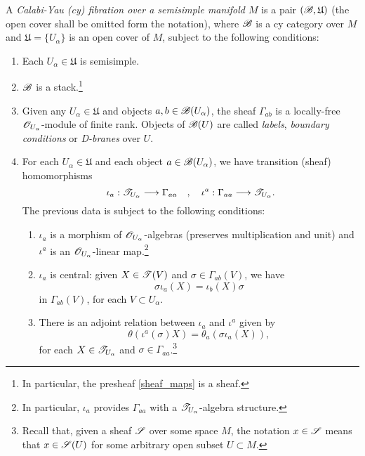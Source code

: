 \begin{defi}\label{cy_fibration}
  A \emph{Calabi-Yau ({\sc cy}) fibration over a semisimple manifold $M$} is
  a pair $(\mathscr{B},\mathfrak{U})$ (the open cover shall be omitted
  form the notation), where $\mathscr{B}$ is a {\sc cy} category over $M$ and
  $\mathfrak{U}=\{U_\alpha \}$ is an open cover of $M$, subject to the
  following conditions:
  \begin{enumerate}
  \item Each $U_\alpha \in \mathfrak{U}$ is semisimple.
  \item $\mathscr{B}$ is a stack.\footnote{In particular, the presheaf
      \eqref{sheaf_maps} is a sheaf.}
  \item Given any $U_\alpha\in \mathfrak{U}$ and objects $a,b\in
    \mathscr{B}(U_\alpha)$, the sheaf $\Gamma_{ab}$ is a locally-free
    $\mathscr{O}_{U_\alpha}$-module of finite rank. Objects of $\mathscr{B}(U)$ are called \emph{labels},
    \emph{boundary conditions} or \emph{D-branes} over $U$.
  \item For each $U_\alpha \in \mathfrak{U}$ and each object $a\in
    \mathscr{B}(U_\alpha )$, we have transition (sheaf) homomorphisms
    \begin{displaymath}
      \iota_a:\mathscr{T}_{U_\alpha}\longrightarrow \Gamma_{aa} 
      \quad , \quad \iota^a:\Gamma_{aa}\longrightarrow \mathscr{T}_{U_\alpha}.     
    \end{displaymath}
The previous data is subject to the following conditions:

\begin{enumerate}
\item $\iota_a$ is a morphism of $\mathscr{O}_{U_\alpha}$-algebras
  (preserves multiplication and unit) and $\iota^a$ is an
  $\mathscr{O}_{U_\alpha}$-linear map.\footnote{In particular, $\iota_a$
    provides $\Gamma_{aa}$ with a $\mathscr{T}_{U_\alpha}$-algebra
    structure.}
\item $\iota_a$ is central: given $X\in \mathscr{T}(V)$ and $\sigma \in
  \Gamma_{ab}(V)$, we have
  \begin{equation}\label{centrality}
    \sigma \iota_a(X)=\iota_b(X)\sigma
  \end{equation}
  in $\Gamma_{ab}(V)$, for each $V\subset U_\alpha$.
\item There is an adjoint relation between $\iota_a$ and $\iota^a$
  given by
  \begin{equation}\label{adjoint}
    \theta (\iota^a(\sigma )X)=\theta_a(\sigma \iota_a(X)),
  \end{equation}
  for each $X\in \mathscr{T}_{U_\alpha}$ and $\sigma \in
  \Gamma_{aa}$.\footnote{Recall that, given a sheaf $\mathscr{S}$ over
    some space $M$, the notation $x\in \mathscr{S}$ means that $x\in
    \mathscr{S}(U)$ for some arbitrary open subset $U\subset M$.}
\end{enumerate}
\end{enumerate}
\end{defi}

